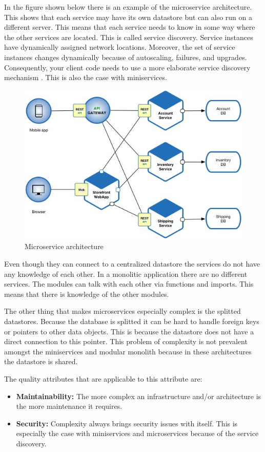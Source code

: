 In the figure shown below there is an example of the microservice architecture. This shows that each service may have its own datastore but can also run on a different server. This means that each service needs to know in some way where the other services are located. This is called service discovery. Service instances have dynamically assigned network locations. Moreover, the set of service instances changes dynamically because of autoscaling, failures, and upgrades. Consequently, your client code needs to use a more elaborate service discovery mechanism \cite{serviceDiscovery}. This is also the case with miniservices.

\begin{figure}[H]
	\includegraphics[width=\linewidth]{microservice-architecture.png}
	\caption{Microservice architecture}
\end{figure}

Even though they can connect to a centralized datastore the services do not have any knowledge of each other. In a monolitic application there are no different services. The modules can talk with each other via functions and imports. This means that there is knowledge of the other modules.

The other thing that makes microservices especially complex is the splitted datastores. Because the database is splitted it can be hard to handle foreign keys or pointers to other data objects. This is because the datastore does not have a direct connection to this pointer. This problem of complexity is not prevalent amongst the miniservices and modular monolith because in these architectures the datastore is shared.

The quality attributes that are applicable to this attribute are:
\begin{itemize}
        \item \textbf{Maintainability:} The more complex an infrastructure and/or architecture is the more maintenance it requires.
        \item \textbf{Security:} Complexity always brings security issues with itself. This is especially the case with miniservices and microservices because of the service discovery.
\end{itemize}

